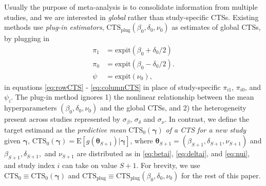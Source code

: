 \documentclass[AMA,STIX1COL]{WileyNJD-v2}
\newcommand{\E}{\mbox{E}}
\newcommand{\boldtheta}{\boldsymbol{\theta}}
\newcommand{\boldgamma}{\boldsymbol{\gamma}}
\newcommand{\CTSo}{\text{CTS}_0}
\newcommand{\CTSp}{\text{CTS}_{\text{plug}}}
\begin{document}
Usually the purpose of meta-analysis is to consolidate information from multiple studies, and we are interested in \textit{global} rather than study-specific CTSs. Existing methods use \textit{plug-in estimators}, $\text{CTS}_{\text{plug}}(\beta_0, \delta_0, \nu_0)$ as estimates of global CTSs, by plugging in 
\begin{align}
\pi_{1} &= \mbox{expit}(\beta_0 + \delta_0 / 2) \nonumber \\
\pi_{0} &= \mbox{expit}(\beta_0 - \delta_0 / 2). \nonumber \\
\psi &= \mbox{expit}(\nu_0), \nonumber
\end{align}
in equations \eqref{eq:rowCTS} - \eqref{eq:columnCTS} in place of study-specific $\pi_{i1}$, $\pi_{i0}$, and $\psi_i$. The plug-in method ignores 1) the nonlinear relationship between the mean hyperparameters $(\beta_0, \delta_0, \nu_0)$ and the global CTSs, and 2) the heterogeneity present across studies represented by $\sigma_{\beta}$, $\sigma_{\delta}$ and $\sigma_{\nu}$. In contrast, we define the target estimand as the \textit{predictive mean} $\CTSo(\boldgamma)$ \textit{of a CTS for a new study} given $\boldgamma$, $\CTSo(\boldgamma) = \E[g(\boldtheta_{S + 1})\vert \boldgamma]$, where $\boldtheta_{S + 1} = (\beta_{S + 1}, \delta_{S + 1}, \nu_{S + 1})$ and $\beta_{S + 1}, \delta_{S + 1},$ and $\nu_{S + 1}$ are distributed as in \eqref{eq:betai}, \eqref{eq:deltai}, and \eqref{eq:nui}, and study index $i$ can take on value $S + 1$. For brevity, we use $\CTSo \equiv \CTSo(\boldgamma)$ and $\CTSp \equiv \CTSp(\beta_0, \delta_0, \nu_0)$ for the rest of this paper. 
\end{document}
